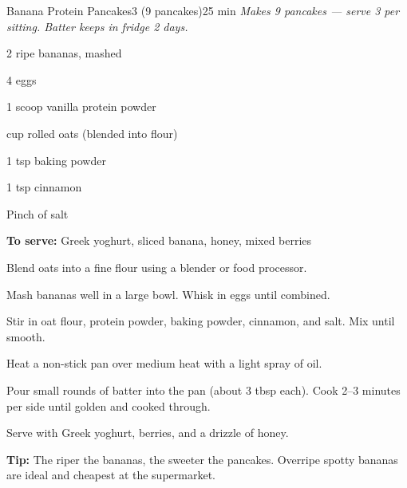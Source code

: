 \begin{recipebox}{Banana Protein Pancakes}{3 (9 pancakes)}{25 min}
\textit{Makes 9 pancakes --- serve 3 per sitting. Batter keeps in fridge 2 days.}

\begin{ingredients}
  \item 2 ripe bananas, mashed
  \item 4 eggs
  \item 1 scoop vanilla protein powder
  \item \textonehalf{} cup rolled oats (blended into flour)
  \item 1 tsp baking powder
  \item 1 tsp cinnamon
  \item Pinch of salt
  \item \textbf{To serve:} Greek yoghurt, sliced banana, honey, mixed berries
\end{ingredients}

\begin{method}
  \item Blend oats into a fine flour using a blender or food processor.
  \item Mash bananas well in a large bowl. Whisk in eggs until combined.
  \item Stir in oat flour, protein powder, baking powder, cinnamon, and salt. Mix until smooth.
  \item Heat a non-stick pan over medium heat with a light spray of oil.
  \item Pour small rounds of batter into the pan (about 3 tbsp each). Cook 2--3 minutes per side until golden and cooked through.
  \item Serve with Greek yoghurt, berries, and a drizzle of honey.
\end{method}

\begin{notelist}
  \item \textbf{Tip:} The riper the bananas, the sweeter the pancakes. Overripe spotty bananas are ideal and cheapest at the supermarket.
\end{notelist}
\end{recipebox}
